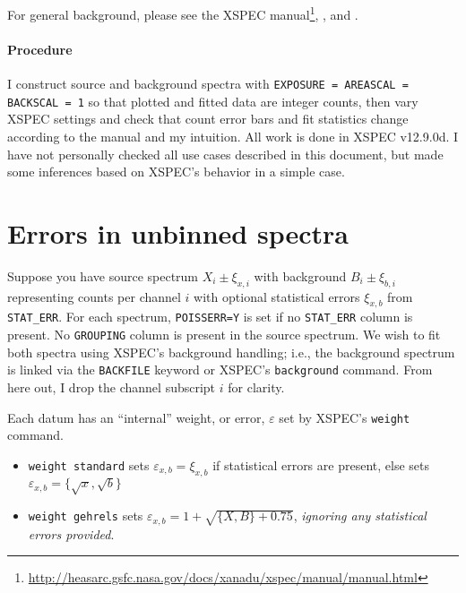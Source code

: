 \documentclass[onecolumn,tighten]{aastex6}
\newcommand*{\code}{\texttt}
\begin{document}
For general background, please see the XSPEC manual\footnote{\href{http://heasarc.gsfc.nasa.gov/docs/xanadu/xspec/manual/manual.html}{http://heasarc.gsfc.nasa.gov/docs/xanadu/xspec/manual/manual.html}},
\citet{cash1979}, and \citet{arnaud2011}.

\paragraph{Procedure}
I construct source and background spectra with \code{EXPOSURE = AREASCAL =
BACKSCAL = 1} so that plotted and fitted data are integer counts,
then vary XSPEC settings and check that count error bars and fit statistics
change according to the manual and my intuition.
All work is done in XSPEC v12.9.0d.
I have not personally checked all use cases described in this document, but
made some inferences based on XSPEC's behavior in a simple case.


\section{Errors in unbinned spectra}

Suppose you have source spectrum $X_i \pm \xi_{x,i}$ with background
$B_i \pm \xi_{b,i}$ representing counts per channel $i$ with optional
statistical errors $\xi_{x,b}$ from \code{STAT\_ERR}.
For each spectrum, \code{POISSERR=Y} is set if no \code{STAT\_ERR} column is
present.
No \code{GROUPING} column is present in the source spectrum.
We wish to fit both spectra using XSPEC's background handling; i.e., the
background spectrum is linked via the \code{BACKFILE} keyword or XSPEC's
\code{background} command.
From here out, I drop the channel subscript $i$ for clarity.

Each datum has an ``internal'' weight, or error, $\varepsilon$ set by XSPEC's \code{weight} command.
\begin{itemize}
  \item \code{weight standard} sets $\varepsilon_{x,b} = \xi_{x,b}$ if statistical errors are present, else sets $\varepsilon_{x,b} = \{\sqrt{x}, \sqrt{b}\}$
  \item \code{weight gehrels} sets $\varepsilon_{x,b} = 1 + \sqrt{ \{X,B\} + 0.75 }$, \emph{ignoring any statistical errors provided}.
\end{itemize}
\end{document}
